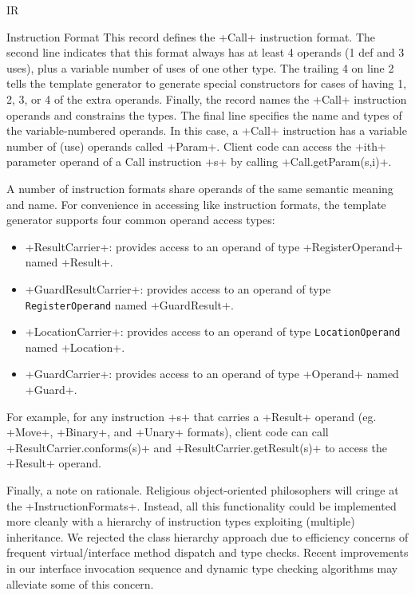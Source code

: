 \begin{subsection}{IR}
\begin{subsubsection}{Instruction Format}
This record defines the \spverb+Call+ instruction format. The second line indicates that this format always has at least 4 operands (1 def and 3 uses), plus a variable number of uses of one other type. The trailing 4 on line 2 tells the template generator to generate special constructors for cases of having 1, 2, 3, or 4 of the extra operands. Finally, the record names the \spverb+Call+ instruction operands and constrains the types. The final line specifies the name and types of the variable-numbered operands. In this case, a \spverb+Call+ instruction has a variable number of (use) operands called \spverb+Param+. Client code can access the \spverb+ith+ parameter operand of a Call instruction \spverb+s+ by calling \spverb+Call.getParam(s,i)+.

A number of instruction formats share operands of the same semantic meaning and name. For convenience in accessing like instruction formats, the template generator supports four common operand access types:
\begin{itemize}
  \item \spverb+ResultCarrier+: provides access to an operand of type \spverb+RegisterOperand+ named \spverb+Result+.
  \item \spverb+GuardResultCarrier+: provides access to an operand of type \texttt{RegisterOperand} named \spverb+GuardResult+.
  \item \spverb+LocationCarrier+: provides access to an operand of type \texttt{LocationOperand} named \spverb+Location+.
  \item \spverb+GuardCarrier+: provides access to an operand of type \spverb+Operand+ named \spverb+Guard+.
\end{itemize}

For example, for any instruction \spverb+s+ that carries a \spverb+Result+ operand (eg. \spverb+Move+, \spverb+Binary+, and \spverb+Unary+ formats), client code can call \spverb+ResultCarrier.conforms(s)+ and \spverb+ResultCarrier.getResult(s)+ to access the \spverb+Result+ operand.

Finally, a note on rationale. Religious object-oriented philosophers will cringe at the \spverb+InstructionFormats+. Instead, all this functionality could be implemented more cleanly with a hierarchy of instruction types exploiting (multiple) inheritance. We rejected the class hierarchy approach due to efficiency concerns of frequent virtual/interface method dispatch and type checks. Recent improvements in our interface invocation sequence and dynamic type checking algorithms may alleviate some of this concern.

\end{subsubsection}

\end{subsection}
